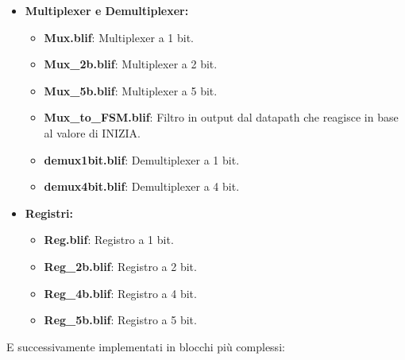 \documentclass[a4paper]{report}
\begin{document}
\begin{itemize}
    \item \textbf{Multiplexer e Demultiplexer:}
    \begin{itemize}
        \item \textbf{Mux.blif}: Multiplexer a 1 bit.
        \item \textbf{Mux\_2b.blif}: Multiplexer a 2 bit.
        \item \textbf{Mux\_5b.blif}: Multiplexer a 5 bit.
        \item \textbf{Mux\_to\_FSM.blif}: Filtro in output dal datapath che reagisce in base al valore di INIZIA.
        \item \textbf{demux1bit.blif}: Demultiplexer a 1 bit.
        \item \textbf{demux4bit.blif}: Demultiplexer a 4 bit.
    \end{itemize}
    
    \item \textbf{Registri:}
    \begin{itemize}
        \item \textbf{Reg.blif}: Registro a 1 bit.
        \item \textbf{Reg\_2b.blif}: Registro a 2 bit.
        \item \textbf{Reg\_4b.blif}: Registro a 4 bit.
        \item \textbf{Reg\_5b.blif}: Registro a 5 bit.
    \end{itemize}
  \end{itemize}

  \normalsize E successivamente implementati in blocchi più complessi:
\end{document}
